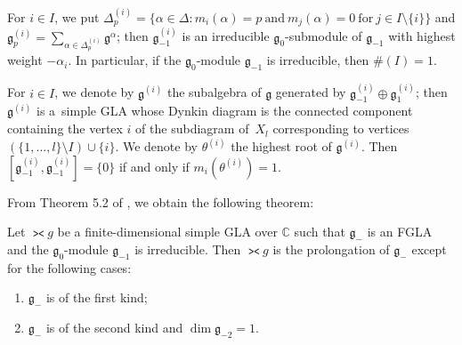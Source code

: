 For $i\in I$, we put $\Delta_p^{(i)}=\{\alpha\in\Delta:
m_i(\alpha)=p\ \text{and}\ m_j(\alpha)=
0\ \text{for}\ j\in I\setminus\{i\} \}$ and
$\mathfrak g_p^{(i)}=\sum\limits_{\alpha\in\Delta_p^{(i)}}\mathfrak g^\alpha$;
then
$\mathfrak g_{-1}^{(i)}$ is an irreducible
$\mathfrak g_0$-submodule of $\mathfrak g_{-1}$ with
highest weight $-\alpha_i$.
In particular, if the $\mathfrak g_0$-module $\mathfrak g_{-1}$
is irreducible, then $\#(I)=1$.

{\samepage For $i\in I$,
we denote by $\mathfrak g^{(i)}$ the subalgebra of $\mathfrak g$ generated by
$\mathfrak g_{-1}^{(i)}\oplus \mathfrak g_{1}^{(i)}$;
then $\mathfrak g^{(i)}$ is a~simple GLA whose
Dynkin diagram is the connected component containing the vertex $i$ of
the sub\-diagram of~$X_l$
corresponding to vertices $(\{1,\dots,l\}\setminus I)\cup\{i\}$.
We denote by $\theta^{(i)}$ the highest root of $\mathfrak g^{(i)}$.
Then $[\mathfrak g_{-1}^{(i)},\mathfrak g_{-1}^{(i)}]=\{0\}$ if and only if
$m_i(\theta^{(i)})=1$.

}

From Theorem 5.2 of \cite{yam93:1}, we obtain the following theorem:
\begin{theorem}\label{thm5.1}
Let $\gla g$ be a finite-dimensional simple GLA over $\mathbb C$ such that
$\mathfrak g_-$ is an FGLA and
the $\mathfrak g_0$-module $\mathfrak g_{-1}$
is irreducible.
Then $\gla g$ is the prolongation of $\mathfrak g_-$ except for
the following cases:
\begin{enumerate}\itemsep=0pt
\renewcommand{\labelenumi}{$(\alph{enumi})$}
\item $\mathfrak g_-$ is of the first kind;
\item $\mathfrak g_-$ is of the second kind and $\dim\mathfrak g_{-2}=1$.
\end{enumerate}
\end{theorem}

